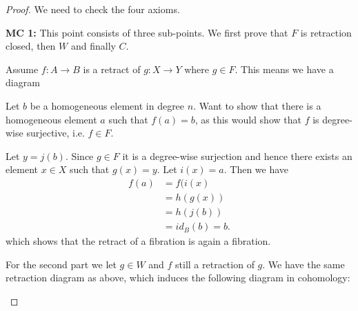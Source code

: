 \begin{proof}
We need to check the four axioms. 

\textbf{MC 1:} This point consists of three sub-points. We first prove that $F$ is retraction closed, then $W$ and finally $C$. 

Assume $f:A\longrightarrow B$ is a retract of $g:X\longrightarrow Y$ where $g\in F$. This means we have a diagram

\begin{center}
\end{center}

Let $b$ be a homogeneous element in degree $n$. Want to show that there is a homogeneous element $a$ such that $f(a)=b$, as this would show that $f$ is degree-wise surjective, i.e. $f\in F$. 
    
Let $y = j(b)$. Since $g\in F$ it is a degree-wise surjection and hence there exists an element $x\in X$ such that $g(x)=y$. Let $i(x)=a$. Then we have 
\begin{align*}
    f(a) 
    &= f(i(x) \\
    &= h(g(x)) \\
    &= h(j(b)) \\
    &= id_B(b) = b.
\end{align*}
which shows that the retract of a fibration is again a fibration. 

For the second part we let $g\in W$ and $f$ still a retraction of $g$. We have the same retraction diagram as above, which induces the following diagram in cohomology:
\begin{center}
\end{center}
\end{proof}
